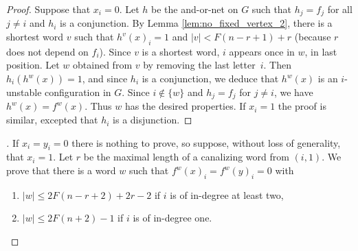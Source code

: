 \documentclass[11pt,letter]{article}
\newcommand{\BF}[1]{{{\boldmath{\bf #1}\unboldmath}}}
\begin{document}
\begin{proof}
Suppose that $x_i=0$. Let $h$ be the and-or-net on $G$ such that $h_j=f_j$ for all $j\neq i$ and $h_i$ is a conjunction. By Lemma \ref{lem:no_fixed_vertex_2}, there is a shortest word $v$ such that $h^v(x)_i=1$ and $|v|<F(n-r+1)+r$ (because $r$ does not depend on $f_i$). Since $v$ is a shortest word, $i$ appears once in $w$, in last position. Let $w$ obtained from $v$ by removing the last letter~$i$. Then $h_i(h^w(x))=1$, and since $h_i$ is a conjunction, we deduce that $h^w(x)$ is an $i$-unstable configuration in $G$. Since $i\not\in\{w\}$ and $h_j=f_j$ for $j\neq i$, we have $h^w(x)=f^w(x)$. Thus $w$ has the desired properties. If $x_i=1$ the proof is similar, excepted that $h_i$ is a disjunction. 
\end{proof}

\begin{proof}[{\BF{Proof of Lemma~\ref{lem:fixing_a_vertex}}}]
If $x_i=y_i=0$ there is nothing to prove, so suppose, without loss of generality, that $x_i=1$. Let $r$ be the maximal length of a canalizing word from $(i,1)$. We prove that there is a word $w$ such that $f^w(x)_i=f^w(y)_i=0$ with 
\begin{enumerate}
\item $|w|\leq 2F(n-r+2)+2r-2$ if $i$ is of in-degree at least two,
\item $|w|\leq 2F(n+2)-1$ if $i$ is of in-degree one. 
\end{enumerate}


\end{proof}
\end{document}
